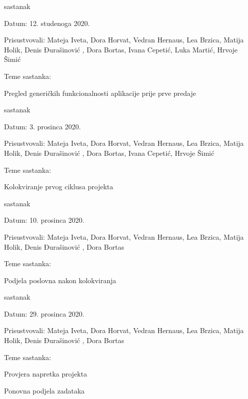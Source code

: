 \begin{packed_enum}
			\item sastanak
			\item[] \begin{packed_item}
				\item Datum: 12. studenoga 2020.
				\item Prisustvovali: Mateja Iveta, Dora Horvat, Vedran Hernaus, Lea Brzica, Matija Holik, Denis Đurašinović , Dora Bortas, Ivana Cepetić, Luka Martić, Hrvoje Šimić
				\item Teme sastanka:
				\begin{packed_item}
					\item Pregled generičkih funkcionalnosti aplikacije prije prve predaje
				\end{packed_item}
			\end{packed_item}
		
			\item sastanak
			\item[] \begin{packed_item}
				\item Datum: 3. prosinca 2020.
				\item Prisustvovali: Mateja Iveta, Dora Horvat, Vedran Hernaus, Lea Brzica, Matija Holik, Denis Đurašinović , Dora Bortas, Ivana Cepetić, Hrvoje Šimić
				\item Teme sastanka:
				\begin{packed_item}
					\item Kolokviranje prvog ciklusa projekta
				\end{packed_item}
			\end{packed_item}
		
			\item sastanak
			\item[] \begin{packed_item}
				\item Datum: 10. prosinca 2020.
				\item Prisustvovali: Mateja Iveta, Dora Horvat, Vedran Hernaus, Lea Brzica, Matija Holik, Denis Đurašinović , Dora Bortas
				\item Teme sastanka:
				\begin{packed_item}
					\item Podjela poslovna nakon kolokviranja
				\end{packed_item}
			\end{packed_item}
		
			\item sastanak
			\item[] \begin{packed_item}
				\item Datum: 29. prosinca 2020.
				\item Prisustvovali: Mateja Iveta, Dora Horvat, Vedran Hernaus, Lea Brzica, Matija Holik, Denis Đurašinović , Dora Bortas
				\item Teme sastanka:
				\begin{packed_item}
					\item Provjera napretka projekta
					\item Ponovna podjela zadataka
				\end{packed_item}
			\end{packed_item}
		

\end{packed_enum}
